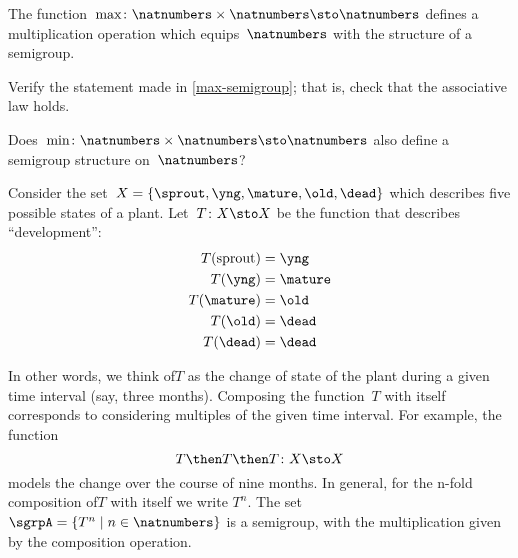 \begin{example}
  \label{max-semigroup}
  The function~$\max \colon \natnumbers \times \natnumbers \sto \natnumbers$ defines a multiplication operation which equips~$\natnumbers$ with the structure of a semigroup.
\end{example}

\begin{exercise}
  \label{ex:max-semigroup}
  Verify the statement made in \cref{max-semigroup}; that is, check that the associative law holds.

  Does~$\min \colon \natnumbers \times \natnumbers \sto \natnumbers$ also define a semigroup structure on~$\natnumbers$?
\end{exercise}
\begin{solution}
\end{solution}


\begin{example}
  \label{plant-trafo-semigroup}
  Consider the set~$X = \{ \sprout, \yng, \mature, \old, \dead \}$ which describes five possible states of a plant. Let~$T \colon X \sto X$ be the function that describes ``development'':
  \begin{align*}
    T(\text{sprout}) &=  \yng \\
    T(\yng) &=  \mature \\
    T(\mature) &=  \old \\
    T( \old) &= \dead \\
    T (\dead) &= \dead
  \end{align*}

  In other words, we think of$T$ as the change of state of the plant during a given time interval (say, three months).
  Composing the function~$T$ with itself corresponds to considering multiples of the given time interval. For example, the function
  \begin{equation*}
    T \then T \then T \colon X \sto X
  \end{equation*}
  models the change over the course of nine months. In general, for the n-fold composition of$T$ with itself we write $T^n$.
  The set~$\sgrpA = \{ T^n \mid n \in \natnumbers \}$ is a semigroup, with the multiplication given by the composition operation.
\end{example}

